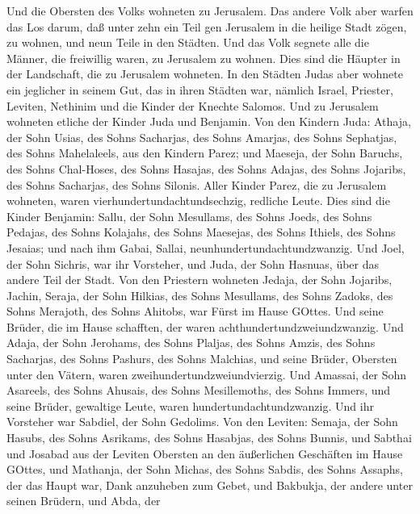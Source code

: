  Und die Obersten des Volks wohneten zu Jerusalem. Das
andere Volk aber warfen das Los darum, daß unter zehn ein Teil gen
Jerusalem in die heilige Stadt zögen, zu wohnen, und neun Teile in den
Städten.  Und das Volk segnete alle die Männer, die
freiwillig waren, zu Jerusalem zu wohnen.  Dies sind die
Häupter in der Landschaft, die zu Jerusalem wohneten. In den Städten
Judas aber wohnete ein jeglicher in seinem Gut, das in ihren Städten
war, nämlich Israel, Priester, Leviten, Nethinim und die Kinder der
Knechte Salomos.  Und zu Jerusalem wohneten etliche der
Kinder Juda und Benjamin. Von den Kindern Juda: Athaja, der Sohn Usias,
des Sohns Sacharjas, des Sohns Amarjas, des Sohns Sephatjas, des Sohns
Mahelaleels, aus den Kindern Parez;  und Maeseja, der Sohn
Baruchs, des Sohns Chal-Hoses, des Sohns Hasajas, des Sohns Adajas, des
Sohns Jojaribs, des Sohns Sacharjas, des Sohns Silonis. 
Aller Kinder Parez, die zu Jerusalem wohneten, waren
vierhundertundachtundsechzig, redliche Leute.  Dies sind die
Kinder Benjamin: Sallu, der Sohn Mesullams, des Sohns Joeds, des Sohns
Pedajas, des Sohns Kolajahs, des Sohns Maesejas, des Sohns Ithiels, des
Sohns Jesaias;  und nach ihm Gabai, Sallai,
neunhundertundachtundzwanzig.  Und Joel, der Sohn Sichris,
war ihr Vorsteher, und Juda, der Sohn Hasnuas, über das andere Teil der
Stadt.  Von den Priestern wohneten Jedaja, der Sohn
Jojaribs, Jachin,  Seraja, der Sohn Hilkias, des Sohns
Mesullams, des Sohns Zadoks, des Sohns Merajoth, des Sohns Ahitobs, war
Fürst im Hause GOttes.  Und seine Brüder, die im Hause
schafften, der waren achthundertundzweiundzwanzig. Und Adaja, der Sohn
Jerohams, des Sohns Plaljas, des Sohns Amzis, des Sohns Sacharjas, des
Sohns Pashurs, des Sohns Malchias,  und seine Brüder,
Obersten unter den Vätern, waren zweihundertundzweiundvierzig. Und
Amassai, der Sohn Asareels, des Sohns Ahusais, des Sohns Mesillemoths,
des Sohns Immers,  und seine Brüder, gewaltige Leute, waren
hundertundachtundzwanzig. Und ihr Vorsteher war Sabdiel, der Sohn
Gedolims.  Von den Leviten: Semaja, der Sohn Hasubs, des
Sohns Asrikams, des Sohns Hasabjas, des Sohns Bunnis,  und
Sabthai und Josabad aus der Leviten Obersten an den äußerlichen
Geschäften im Hause GOttes,  und Mathanja, der Sohn Michas,
des Sohns Sabdis, des Sohns Assaphs, der das Haupt war, Dank anzuheben
zum Gebet, und Bakbukja, der andere unter seinen Brüdern, und Abda, der
